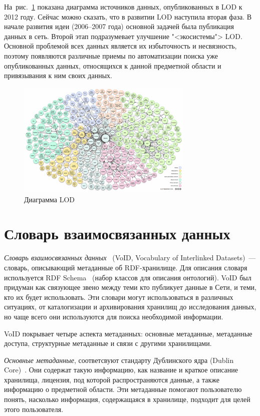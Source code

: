 \documentclass[a4paper, final, 14 pt]{extarticle}
\begin{document}
На~рис.~\ref{lod:datasets} показана диаграмма источников данных, опубликованных в LOD к 2012 году. Сейчас
можно сказать, что в развитии LOD наступила вторая фаза. В начале развития идеи (2006--2007 года)
основной задачей была публикация данных в сеть. Второй этап подразумевает улучшение "<экосистемы"> 
LOD. Основной проблемой всех данных является их избыточность и несвязность, поэтому появляются
различные приемы по автоматизации поиска уже опубликованных данных, относящихся к данной предметной
области и привязывания к ним своих данных.

\begin{figure}[h]
  \centering
  \includegraphics[width=0.75\textwidth]{cloud12.png}
  \caption{Диаграмма LOD}
  \label{lod:datasets}
\end{figure}

\newpage
\section{Словарь взаимосвязанных данных}

\emph{Словарь взаимосвязанных данных}~\cite{web:void,article:void} (VoID, Vocabulary of Interlinked Datasets)~--- 
словарь, описывающий метаданные об RDF-хранилище. Для описания словаря используется RDF Schema~\cite{web:rdfs}
(набор классов для описания онтологий). VoID был придуман как связующее звено между теми кто публикует 
данные в Сети, и теми, кто их будет использовать. Эти словари могут использоваться в различных
ситуациях, от каталогизации и архивирования хранилищ до исследования данных, но чаще всего они 
используются для поиска необходимой информации.

VoID покрывает четыре аспекта метаданных: основные метаданные, метаданные доступа, структурные 
метаданные и связи с другими хранилищами.

\emph{Основные метаданные}, соответсвуют стандарту Дублинского ядра (Dublin Core)~\cite{web:dublincore}. 
Они содержат такую информацию, как название и краткое описание хранилища, лицензия, под которой 
распространяются данные, а также информацию о предметной области. Эти метаданные помогают 
пользователю понять, насколько информация, содержащаяся в хранилище, подходит для целей этого пользователя. 
\end{document}
